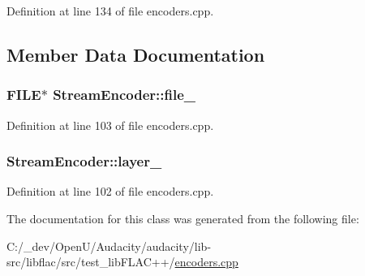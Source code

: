 Definition at line 134 of file encoders.\+cpp.



\subsection{Member Data Documentation}
\subsubsection[{\texorpdfstring{file\+\_\+}{file_}}]{\setlength{\rightskip}{0pt plus 5cm}F\+I\+LE$\ast$ Stream\+Encoder\+::file\+\_\+}\hypertarget{class_stream_encoder_ade400428b0f8aebe757dd4ef6a4ed3b6}{}\label{class_stream_encoder_ade400428b0f8aebe757dd4ef6a4ed3b6}


Definition at line 103 of file encoders.\+cpp.

\subsubsection[{\texorpdfstring{layer\+\_\+}{layer_}}]{ Stream\+Encoder\+::layer\+\_\+}\hypertarget{class_stream_encoder_a5e5ae361055466824b4fea59826aecb0}{}\label{class_stream_encoder_a5e5ae361055466824b4fea59826aecb0}


Definition at line 102 of file encoders.\+cpp.



The documentation for this class was generated from the following file\+:\begin{DoxyCompactItemize}
\item 
C\+:/\+\_\+dev/\+Open\+U/\+Audacity/audacity/lib-\/src/libflac/src/test\+\_\+lib\+F\+L\+A\+C++/\hyperlink{encoders_8cpp}{encoders.\+cpp}\end{DoxyCompactItemize}
